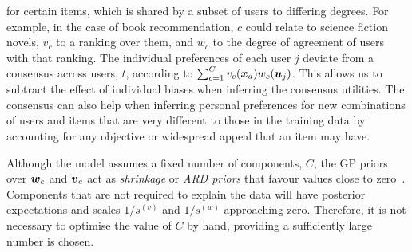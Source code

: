 for certain items, which is shared by a subset of users to differing degrees.
For example, in the case of book recommendation,
$c$ could relate to science fiction novels, 
$v_c$ to a ranking over them,
and $w_c$ to the degree of agreement of users with that ranking.
The individual preferences of each user $j$ deviate from a consensus across users, $t$, according
to $\sum_{c=1}^C  v_c(\boldsymbol x_a) w_c(\boldsymbol u_j)$. 
This allows us to subtract the effect of individual biases when inferring the consensus utilities. 
The consensus can also help 
when inferring personal preferences for %
new combinations of users and items that are
very different to those in the training data by
 accounting for any objective or widespread appeal that an item may have.

Although the model assumes a fixed number of components, $C$,
the GP priors over $\boldsymbol w_c$ and $\boldsymbol v_c$ act as \emph{shrinkage}
or \emph{ARD priors} that favour values close to zero~\citep{mackay1995probable,psorakis2011overlapping}. 
Components that are not required to explain the data will have posterior
expectations and scales $1/s^{(v)}$ and $1/s^{(w)}$ approaching zero.
Therefore, %
it is not necessary to optimise the value of $C$ by hand, 
providing a sufficiently large number is chosen. 

